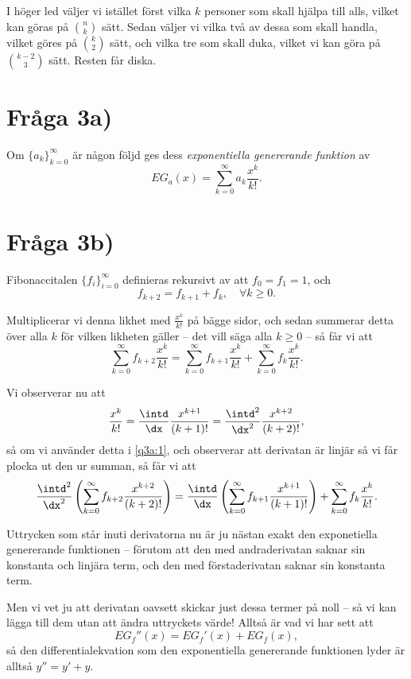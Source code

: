\documentclass[nobib]{tufte-handout}
\begin{document}
I höger led väljer vi istället först vilka $k$ personer som skall hjälpa till alls, vilket kan göras på $n \choose k$ sätt. Sedan väljer vi vilka två av dessa som skall handla, vilket göres på $k \choose 2$ sätt, och vilka tre som skall duka, vilket vi kan göra på $k - 2 \choose 3$ sätt. Resten får diska.

\section{Fråga 3a)}

\begin{definition}
    Om $\{a_k\}_{k=0}^\infty$ är någon följd ges dess \emph{exponentiella genererande funktion} av
    $$EG_a(x) = \sum_{k=0}^{\infty} a_k \frac{x^k}{k!}.$$
\end{definition}
 
\section{Fråga 3b)}

Fibonaccitalen $\{f_i\}_{i=0}^\infty$ definieras rekursivt av att $f_0 = f_1 = 1$, och
$$f_{k+2} = f_{k+1} + f_k, \quad \forall k \geq 0.$$

Multiplicerar vi denna likhet med $\frac{x^k}{k!}$ på bägge sidor, och sedan summerar detta över alla $k$ för vilken likheten gäller -- det vill säga alla $k \geq 0$ -- så får vi att
\begin{equation}\label{q3a:1}
    \sum_{k=0}^{\infty} f_{k+2}\frac{x^k}{k!} = \sum_{k=0}^{\infty} f_{k+1}\frac{x^k}{k!} + \sum_{k=0}^{\infty} f_{k}\frac{x^k}{k!}.
\end{equation}

Vi observerar nu att
$$\frac{x^k}{k!} = \frac{\intd}{\dx} \frac{x^{k+1}}{(k+1)!} = \frac{\intd^2}{\dx^2} \frac{x^{k+2}}{(k+2)!},$$
så om vi använder detta i \eqref{q3a:1}, och observerar att derivatan är linjär så vi får plocka ut den ur summan, så får vi att
$$\frac{\intd^2}{\dx^2}\left(\sum_{k=0}^{\infty} f_{k+2}\frac{x^{k+2}}{(k+2)!}\right) = \frac{\intd}{\dx}\left(\sum_{k=0}^{\infty} f_{k+1}\frac{x^{k+1}}{(k+1)!}\right) + \sum_{k=0}^{\infty} f_{k}\frac{x^k}{k!}.$$

Uttrycken som står inuti derivatorna nu är ju nästan exakt den exponetiella genererande funktionen -- förutom att den med andraderivatan saknar sin konstanta och linjära term, och den med förstaderivatan saknar sin konstanta term.

Men vi vet ju att derivatan oavsett skickar just dessa termer på noll -- så vi kan lägga till dem utan att ändra uttryckets värde! Alltså är vad vi har sett att
$$EG_f''(x) = EG_f'(x) + EG_f(x),$$
så den differentialekvation som den exponentiella genererande funktionen lyder är alltså $y'' = y' + y$.
\end{document}

